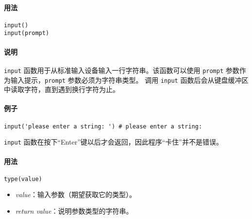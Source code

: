 \paragraph{用法}
\begin{lstlisting}[language=berry, numbers=none]
input()
input(prompt)
\end{lstlisting}

\paragraph{说明}
\texttt{input} 函数用于从标准输入设备输入一行字符串。该函数可以使用 \texttt{prompt} 参数作为输入提示，\texttt{prompt} 参数必须为字符串类型。
调用 \texttt{input} 函数后会从键盘缓冲区中读取字符，直到遇到换行字符为止。

\paragraph{例子}
\begin{lstlisting}[language=berry, numbers=none]
input('please enter a string: ') # please enter a string: 
\end{lstlisting}
\texttt{input} 函数在按下``Enter''键以后才会返回，因此程序“卡住”并不是错误。

 \label{section::baselib_type}

\paragraph{用法}
\begin{lstlisting}[language=berry, numbers=none]
type(value)
\end{lstlisting}

\begin{itemize}
    \item \emph{value}：输入参数（期望获取它的类型）。
    \item \emph{return value}：说明参数类型的字符串。
\end{itemize}

